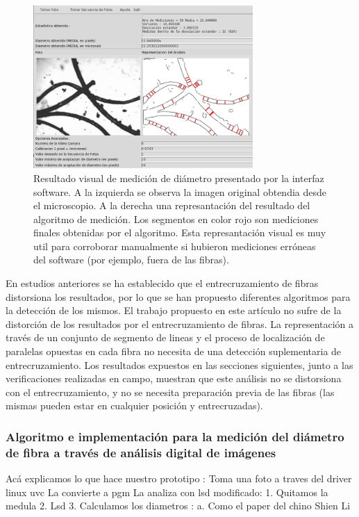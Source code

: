 \documentclass[runningheads,a4paper]{llncs}
\begin{document}
\begin{figure}
\centering
\includegraphics[height=6.2cm]{captura}
\caption{Resultado visual de medición de diámetro presentado por la interfaz software. A la izquierda se observa la imagen original obtendia desde el microscopio. A la derecha una represantación del resultado del algoritmo de medición. Los segmentos en color rojo son mediciones finales obtenidas por el algoritmo. Esta represantación visual es muy util para corroborar manualmente si hubieron mediciones erróneas del software (por ejemplo, fuera de las fibras).
}
\label{fig:captura}
\end{figure}



En estudios anteriores se ha establecido que el entrecruzamiento de fibras distorsiona los resultados, por lo que se han propuesto diferentes algoritmos para la detección de los mismos.
El trabajo propuesto en este artículo no sufre de la distorción de los resultados por el entrecruzamiento de fibras. 
La representación a través de un conjunto de segmento de lineas y el proceso de localización de paralelas opuestas en cada fibra no necesita de una detección suplementaria de entrecruzamiento. Los resultados expuestos en las secciones siguientes, junto a las verificaciones realizadas en campo, muestran que este análisis no se distorsiona con el entrecruzamiento, y no se necesita preparación previa de las fibras (las mismas pueden estar en cualquier posición y entrecruzadas).


	

\subsubsection{Algoritmo e implementación para la medición del diámetro de fibra a través de análisis digital de imágenes}

Acá explicamos lo que hace nuestro prototipo :
Toma una foto a traves del driver linux uvc
La convierte a pgm
La analiza con lsd modificado:
1. Quitamos la medula
2. Lsd
3. Calculamos los diametros :
a. Como el paper del chino Shien Li
\end{document}
